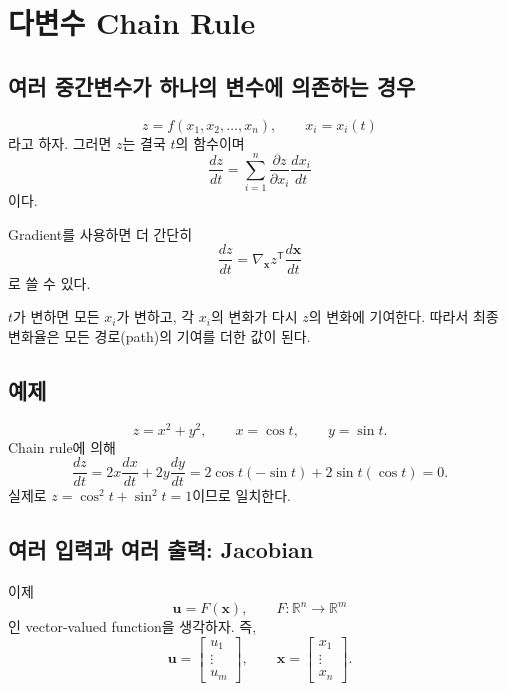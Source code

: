 \documentclass[11pt,a4paper]{article}
\newcommand{\R}{\mathbb{R}}
\newcommand{\grad}{\nabla}
\newcommand{\vect}[1]{\bm{#1}}
\newcommand{\T}{^{\mathsf T}}
\begin{document}
\section{다변수 Chain Rule}

\subsection{여러 중간변수가 하나의 변수에 의존하는 경우}

\[
z=f(x_1,x_2,\ldots,x_n),
\qquad
x_i=x_i(t)
\]
라고 하자. 그러면 $z$는 결국 $t$의 함수이며
\[
\boxed{
\frac{dz}{dt}
=
\sum_{i=1}^n
\frac{\partial z}{\partial x_i}
\frac{dx_i}{dt}
}
\]
이다.

Gradient를 사용하면 더 간단히
\[
\boxed{
\frac{dz}{dt}
=
\grad_{\vect{x}}z\T
\frac{d\vect{x}}{dt}
}
\]
로 쓸 수 있다.

\begin{center}
\end{center}

$t$가 변하면 모든 $x_i$가 변하고, 각 $x_i$의 변화가 다시 $z$의 변화에 기여한다.
따라서 최종 변화율은 모든 경로(path)의 기여를 더한 값이 된다.

\subsection{예제}

\[
z=x^2+y^2,
\qquad
x=\cos t,
\qquad
y=\sin t.
\]
Chain rule에 의해
\[
\frac{dz}{dt}
=
2x\frac{dx}{dt}
+2y\frac{dy}{dt}
=
2\cos t(-\sin t)+2\sin t(\cos t)=0.
\]
실제로 $z=\cos^2t+\sin^2t=1$이므로 일치한다.

\subsection{여러 입력과 여러 출력: Jacobian}

이제
\[
\vect{u}=F(\vect{x}),
\qquad
F:\R^n\to\R^m
\]
인 vector-valued function을 생각하자. 즉,
\[
\vect{u}
=
\begin{bmatrix}
u_1\\ \vdots\\ u_m
\end{bmatrix},
\qquad
\vect{x}
=
\begin{bmatrix}
x_1\\ \vdots\\ x_n
\end{bmatrix}.
\]
\end{document}

